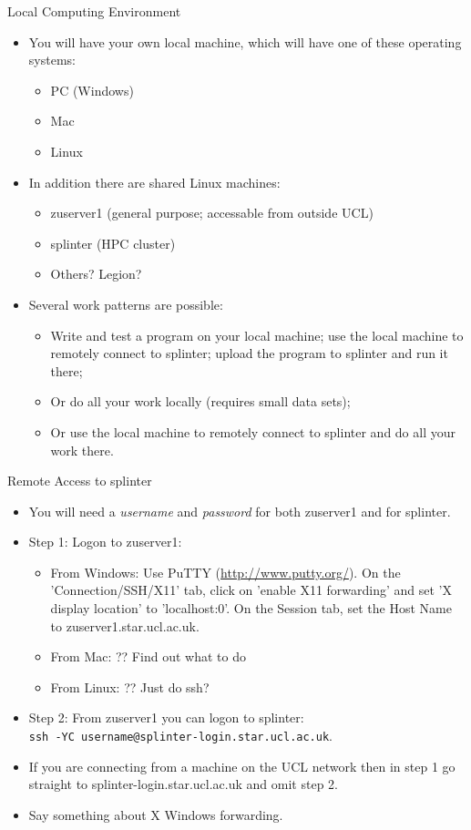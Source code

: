 \documentclass{beamer}
\begin{document}
\begin{frame}{Local Computing Environment}
  \begin{itemize}
  \item You will have your own local machine, which will have one of these operating systems:
    \begin{itemize}
    \item PC (Windows)
    \item Mac
    \item Linux
    \end{itemize}
  \item In addition there are shared Linux machines:
    \begin{itemize}
    \item zuserver1 (general purpose; accessable from outside UCL)
    \item splinter (HPC cluster)
    \item Others? Legion?
    \end{itemize}
  \item Several work patterns are possible:
    \begin{itemize}
    \item Write and test a program on your local machine; use the local machine to remotely connect to splinter; upload the program to splinter and run it there;
    \item Or do all your work locally (requires small data sets);
    \item Or use the local machine to remotely connect to splinter and do all your work there.
    \end{itemize}
  \end{itemize}
\end{frame}

\begin{frame}{Remote Access to splinter}
  \begin{itemize}
  \item You will need a \textit{username} and \textit{password} for both zuserver1 and for splinter.
  \item Step 1: Logon to zuserver1:
    \begin{itemize}
    \item From Windows: Use PuTTY (\url{http://www.putty.org/}). On the 'Connection/SSH/X11' tab, click on 'enable X11 forwarding' and set 'X display location' to 'localhost:0'. On the Session tab, set the Host Name to zuserver1.star.ucl.ac.uk.
    \item From Mac: ?? Find out what to do
    \item From Linux: ?? Just do ssh?
    \end{itemize}
  \item Step 2: From zuserver1 you can logon to splinter: \\ \texttt{ssh -YC username@splinter-login.star.ucl.ac.uk}.
  \item If you are connecting from a machine on the UCL network then in step 1 go straight to splinter-login.star.ucl.ac.uk and omit step 2.
  \item Say something about X Windows forwarding.
  \end{itemize}
\end{frame}
\end{document}
